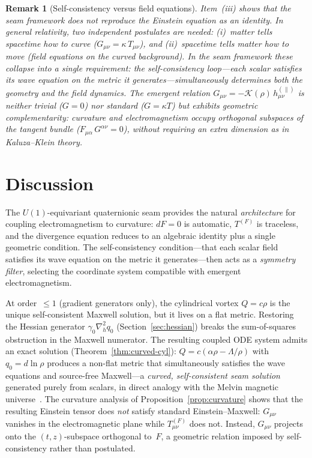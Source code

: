 \documentclass[pdflatex,sn-mathphys-num]{sn-jnl}
\theoremstyle{thmstyleone}%
\theoremstyle{thmstyletwo}%
\newtheorem{remark}[theorem]{Remark}
\theoremstyle{thmstylethree}%
\newcommand{\nn}{\nabla}
\numberwithin{equation}{section}
\begin{document}
\begin{remark}[Self-consistency versus field equations]
\label{rem:no-einstein}
Item~(iii) shows that the seam framework does \emph{not}
reproduce the Einstein equation as an identity.
In general relativity, two independent postulates are
needed: (i)~matter tells spacetime how to curve
($G_{\mu\nu} = \kappa\,T_{\mu\nu}$), and
(ii)~spacetime tells matter how to move (field equations
on the curved background).  In the seam framework these
collapse into a single requirement: the self-consistency
loop---each scalar satisfies its wave equation on the
metric it generates---simultaneously determines both the
geometry and the field dynamics.
The emergent relation
$G_{\mu\nu} = -\mathcal{K}(\rho)\,h^{(\|)}_{\mu\nu}$
is neither trivial ($G = 0$) nor standard ($G = \kappa T$)
but exhibits \emph{geometric complementarity}: curvature
and electromagnetism occupy orthogonal subspaces of the
tangent bundle ($F_{\mu\alpha}\,G^{\alpha\nu} = 0$),
without requiring an extra dimension as in Kaluza--Klein
theory.
\end{remark}

\section{Discussion}
\label{sec:discussion}

The $U(1)$-equivariant quaternionic seam provides the natural
\emph{architecture} for coupling electromagnetism to
curvature:
$dF = 0$ is automatic, $T^{(F)}$ is traceless, and the
divergence equation reduces to an algebraic identity plus a
single geometric condition.  The self-consistency condition---that
each scalar field satisfies its wave equation on the metric it
generates---then acts as a \emph{symmetry filter}, selecting
the coordinate system compatible with emergent electromagnetism.

At order~$\le 1$ (gradient generators only), the cylindrical
vortex $Q = c\rho$ is the unique self-consistent Maxwell
solution, but it lives on a flat metric.  Restoring the
Hessian generator $\gamma_0\nn^2_h q_0$
(Section~\ref{sec:hessian}) breaks the sum-of-squares
obstruction in the Maxwell numerator.  The resulting coupled
ODE system admits an exact solution
(Theorem~\ref{thm:curved-cyl}):
$Q = c(\alpha\rho - \Lambda/\rho)$
with $q_0 = d\ln\rho$ produces a non-flat metric that
simultaneously satisfies the wave equations and source-free
Maxwell---a \emph{curved, self-consistent seam solution}
generated purely from scalars, in direct analogy with the
Melvin magnetic universe~\cite{Melvin1964}.  The curvature
analysis of Proposition~\ref{prop:curvature} shows that
the resulting Einstein tensor does \emph{not} satisfy
standard Einstein--Maxwell: $G_{\mu\nu}$ vanishes in the
electromagnetic plane while $T^{(F)}_{\mu\nu}$ does not.
Instead, $G_{\mu\nu}$ projects onto the $(t,z)$-subspace
orthogonal to~$F$, a geometric relation imposed by
self-consistency rather than postulated.
\end{document}
